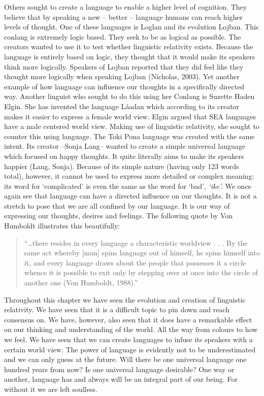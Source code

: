  
	Others sought to create a language to enable a higher level of cognition. They believe that by speaking a new – better – language humans can reach higher levels of thought. One of these languages is Loglan and its evolution Lojban. This conlang is extremely logic based. They seek to be as logical as possible. The creators wanted to use it to test whether linguistic relativity exists. Because the language is entirely based on logic, they thought that it would make its speakers think more logically. Speakers of Lojban reported that they did feel like they thought more logically when speaking Lojban (Nicholas, 2003). Yet another example of how language can influence our thoughts in a specifically directed way. Another linguist who sought to do this using her Conlang is Suzette Haden Elgin. She has invented the language Láadan which according to its creator makes it easier to express a female world view. Elgin argued that SEA languages have a male centered world view. Making use of linguistic relativity, she sought to counter this using language. The Toki Pona language was created with the same intent. Its creator –Sonja Lang– wanted to create a simple universal language which focused on happy thoughts. It quite literally aims to make its speakers happier (Lang, Sonja). Because of its simple nature (having only 123 words total), however, it cannot be used to express more detailed or complex meaning: its word for ‘complicated’ is even the same as the word for ‘bad’, \textit{‘ike’.} We once again see that language can have a directed influence on our thoughts. It is not a stretch to pose that we are all confined by our language. It is our way of expressing our thoughts, desires and feelings. The following quote by Von Humboldt illustrates this beautifully: 

\begin{quote}
\begin{singlespace}
“…there resides in every language a characteristic worldview . . . By the same act whereby [man] spins language out of himself, he spins himself into it, and every language draws about the people that possesses it a circle whence it is possible to exit only by stepping over at once into the circle of another one (Von Humboldt, 1988).”
\end{singlespace}
\end{quote}

\noindent Throughout this chapter we have seen the evolution and creation of linguistic relativity. We have seen that it is a difficult topic to pin down and reach consensus on. We have, however, also seen that it does have a remarkable effect on our thinking and understanding of the world. All the way from colours to how we feel. We have seen that we can create languages to infuse its speakers with a certain world view. The power of language is evidently not to be underestimated and we can only guess at the future. Will there be one universal language one hundred years from now? Is one universal language desirable? One way or another, language has and always will be an integral part of our being. For without it we are left soulless.  

